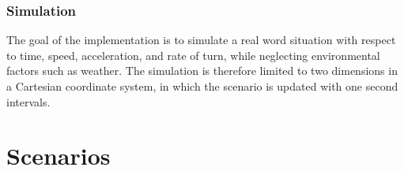 












\subsection{Simulation}
The goal of the implementation is to simulate a real word situation with respect to time, speed, acceleration, and rate of turn, while neglecting  environmental factors such as weather. The simulation is therefore limited to two dimensions in a Cartesian coordinate system, in which the scenario is updated with one second intervals.



\chapter{Scenarios}
